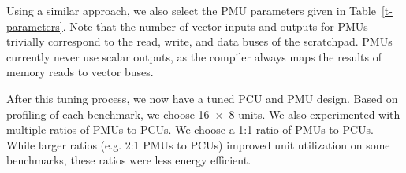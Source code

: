 Using a similar approach, we also select the PMU parameters given in Table~\ref{t-parameters}. Note that the number of 
vector inputs and outputs for PMUs trivially correspond to the read, write, and data buses of the scratchpad. 
PMUs currently never use scalar outputs, as the compiler always maps the results of memory reads to vector buses.

After this tuning process, we now have a 
tuned PCU and PMU design. Based on profiling of each benchmark, we choose 16~$\times$~8 units.
We also experimented with multiple ratios of PMUs to PCUs. 
We choose a 1:1 ratio of PMUs to PCUs. 
While larger ratios (e.g. 2:1 PMUs to PCUs) improved unit utilization on some benchmarks, these ratios were less energy efficient.






